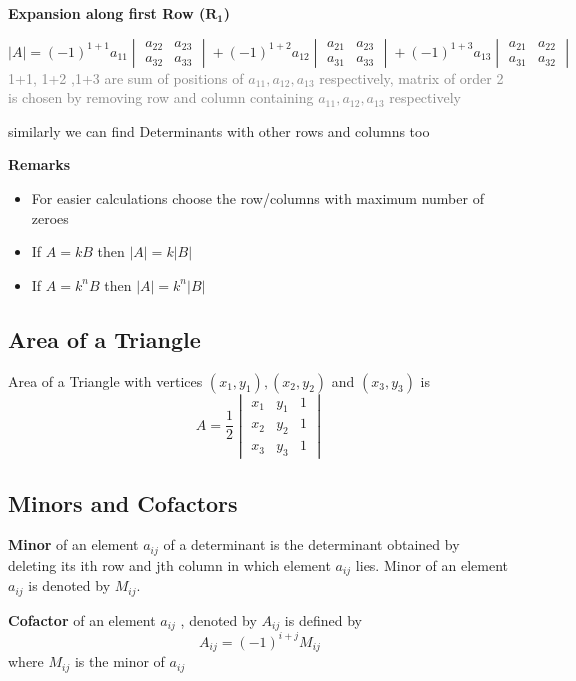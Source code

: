 \documentclass[12pt]{article}
\begin{document}
\textbf{Expansion along first Row ($\mathbf{R_1}$)}

$$|A|=(-1)^{1+1} a_{11} \begin{vmatrix}
    a_{22} & a_{23} \\
    a_{32} & a_{33}
 \end{vmatrix}+(-1)^{1+2}a_{12} \begin{vmatrix}
    a_{21} & a_{23} \\
    a_{31} & a_{33}
 \end{vmatrix}+(-1)^{1+3} a_{13}\begin{vmatrix}
    a_{21} & a_{22} \\
    a_{31} & a_{32}
 \end{vmatrix}$$
\textcolor{gray}{1+1, 1+2 ,1+3 are sum of positions of $a_{11},a_{12},a_{13}$ respectively, matrix of order 2 is chosen by removing row and column containing $a_{11},a_{12},a_{13}$ respectively} 

similarly we can find Determinants with other rows and columns  too

\textbf{Remarks}

\begin{itemize}
    \item For easier calculations choose the row/columns with maximum number of zeroes 
    \item If $A=kB$ then $|A|=k|B|$
    \item If $A=k^n B$ then $|A|=k^n|B|$
\end{itemize}

\subsection*{Area of a Triangle}
Area of a  Triangle with vertices $(x_1,y_1),(x_2,y_2)$ and $(x_3,y_3)$ is $$A=\frac{1}{2}\begin{vmatrix}
    x_1 & y_1 & 1 \\
    x_2 & y_2 & 1 \\
    x_3 & y_3 & 1
\end{vmatrix}$$

\subsection*{Minors and Cofactors}
\textbf{Minor} of an element $a_{ij}$ of a determinant is the determinant obtained by
deleting its ith row and jth column in which element $a_{ij}$ lies. Minor of an element $a_{ij}$ is
denoted by $M_{ij}$.

\textbf{Cofactor} of an element $a_{ij}$ , denoted by $A_{ij}$ is defined by $$A_{ij}=(-1)^{i+j}M_{ij}$$ where $M_{ij}$ is the minor of $a_{ij}$
\end{document}
